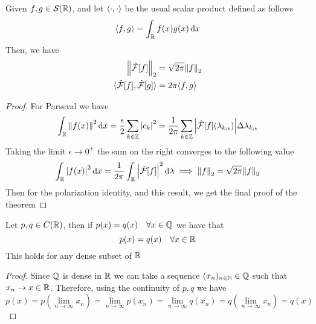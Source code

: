 \documentclass[../complete.tex]{subfiles}
\begin{document}
\begin{thm}[Plancherel]
	Given $f,g\in\Sp(\R)$, and let $\sprd$ be the usual scalar product defined as follows
	\begin{equation*}
		\spr{f}{g}=\int_{\R}^{}f(x)g(x)\diff x
	\end{equation*}
	Then, we have
	\begin{equation}
		\begin{aligned}
			\pnorm[2]{\fou[f]}&=\sqrt{2\pi}\pnorm[2]{f}\\
			\spr{\fou[f]}{\fou[g]}&=2\pi\spr{f}{g}
		\end{aligned}
		\label{eq:planchthm}
	\end{equation}
\end{thm}
\begin{proof}
	For Parseval we have
	\begin{equation*}
		\int_{\R}^{}\norm{f(x)}^2\diff x=\frac{\epsilon}{2}\sum_{k\in\Z}^{}\abs{c_k}^2=\frac{1}{2\pi}\sum_{k\in\Z}^{}\abs{\fou[f](\lambda_{k,\epsilon})}\Delta\lambda_{k,\epsilon}
	\end{equation*}
	Taking the limit $\epsilon\to0^+$ the sum on the right converges to the following value
	\begin{equation*}
		\int_{\R}^{}\abs{f(x)}^2\diff x=\frac{1}{2\pi}\int_{\R}^{}\abs{\fou[f]}^2\diff\lambda\implies\pnorm[2]{f}=\sqrt{2\pi}\pnorm[2]{f}
	\end{equation*}
	Then for the polarization identity, and this result, we get the final proof of the theorem
\end{proof}
\begin{thm}
	Let $p,q\in C(\R)$, then if $p(x)=q(x)\quad\forall x\in\Q$ we have that
	\begin{equation*}
		p(x)=q(x)\quad\forall x\in\R
	\end{equation*}
	This holds for any dense subset of $\R$
\end{thm}
\begin{proof}
	Since $\Q$ is dense in $\R$ we can take a sequence $(x_n)_{n\in\N}\in\Q$ such that $x_n\to x\in\R$. Therefore, using the continuity of $p,q$ we have
	\begin{equation*}
		p(x)=p\left( \lim_{n\to\infty}x_n \right)=\lim_{n\to\infty}p(x_n)=\lim_{n\to\infty}q(x_n)=q\left( \lim_{n\to\infty}x_n \right)=q(x)
	\end{equation*}
\end{proof}
\end{document}
